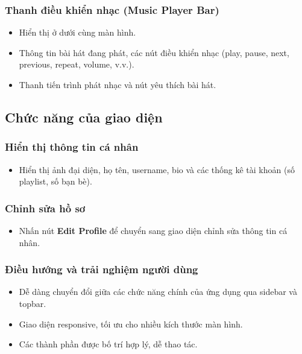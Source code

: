 \documentclass{book}
\begin{document}
\subsubsection{Thanh điều khiển nhạc (Music Player Bar)}
\begin{itemize}
    \item Hiển thị ở dưới cùng màn hình.
    \item Thông tin bài hát đang phát, các nút điều khiển nhạc (play, pause, next, previous, repeat, volume, v.v.).
    \item Thanh tiến trình phát nhạc và nút yêu thích bài hát.
\end{itemize}

\subsection{Chức năng của giao diện}

\subsubsection{Hiển thị thông tin cá nhân}
\begin{itemize}
    \item Hiển thị ảnh đại diện, họ tên, username, bio và các thống kê tài khoản (số playlist, số bạn bè).
\end{itemize}

\subsubsection{Chỉnh sửa hồ sơ}
\begin{itemize}
    \item Nhấn nút \textbf{Edit Profile} để chuyển sang giao diện chỉnh sửa thông tin cá nhân.
\end{itemize}

\subsubsection{Điều hướng và trải nghiệm người dùng}
\begin{itemize}
    \item Dễ dàng chuyển đổi giữa các chức năng chính của ứng dụng qua sidebar và topbar.
    \item Giao diện responsive, tối ưu cho nhiều kích thước màn hình.
    \item Các thành phần được bố trí hợp lý, dễ thao tác.
\end{itemize}
\end{document}
